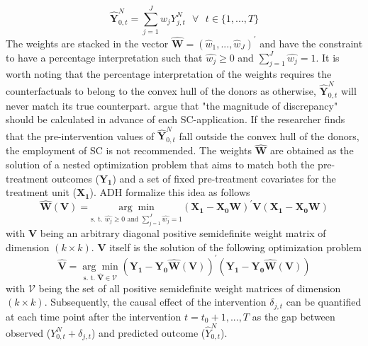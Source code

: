 \[
\widehat{\boldsymbol{Y}}^{N}_{0,t} = \sum_{j = 1}^{J} \widehat{w}_j Y^{N}_{j,t} \text{ } \forall \text{ } t \in \{1,...,T\}
\]
The weights are stacked in the vector $\boldsymbol{\widehat{W}} = (\widehat{w}_1, ... , \widehat{w}_J)^\prime$ and have the constraint to have a percentage interpretation such that $\widehat{w_j} \geq 0$ and $\sum_{j = 1}^{J} \widehat{w_j} = 1$. It is worth noting that the percentage interpretation of the weights requires the counterfactuals to belong to the convex hull of the donors as otherwise, $\widehat{\boldsymbol{Y}}^{N}_{0,t}$ will never match its true counterpart. \cite{abadie:2010} argue that "the magnitude of discrepancy" should be calculated in advance of each \ac{SC}-application. If the researcher finds that the pre-intervention values of $\widehat{\boldsymbol{Y}}^{N}_{0,t}$ fall outside the convex hull of the donors, the employment of \ac{SC} is not recommended. The weights $\boldsymbol{\widehat{W}}$ are obtained as the solution of a nested optimization problem that aims to match both the pre-treatment outcomes ($\boldsymbol{Y_1}$) and a set of fixed pre-treatment covariates for the treatment unit ($\boldsymbol{X_1}$). \ac{ADH} formalize this idea as follows
\[
\widehat{\boldsymbol{W}}(\boldsymbol{V}) = 
\underset{\text{s. t. }\widehat{w_j} \geq 0 \text{ and } \sum_{j = 1}^{J} \widehat{w_j} = 1}{\arg\min}
(\boldsymbol{X_1} - \boldsymbol{X_0}\boldsymbol{W})^\prime \boldsymbol{V}(\boldsymbol{X_1} - \boldsymbol{X_0}\boldsymbol{W})
\]
with $\boldsymbol{V}$ being an arbitrary diagonal positive semidefinite weight matrix of dimension $(k \times k)$. $\boldsymbol{V}$ itself is the solution of the following optimization problem
\[
\widehat{\boldsymbol{V}} = 
\underset{\text{s. t. } \widehat{\boldsymbol{V}} \in \mathcal{V}}{\arg\min}
(\boldsymbol{Y_1} - \boldsymbol{Y_0}\boldsymbol{\widehat{W}}(\boldsymbol{V}))^\prime (\boldsymbol{Y_1} - \boldsymbol{Y_0} \boldsymbol{\widehat{W}}(\boldsymbol{V}))
\]
with $\mathcal{V}$ being the set of all positive semidefinite weight matrices of dimension $(k \times k)$. Subsequently, the causal effect of the intervention $\delta_{j,t}$ can be quantified at each time point after the intervention $t = t_0 +1, ..., T$ as the gap between observed ($Y^{N}_{0,t} + \delta_{j,t}$) and predicted outcome ($\widehat{Y}^{N}_{0,t}$).

